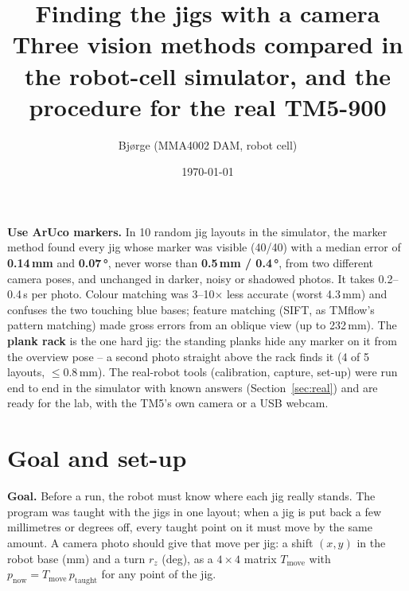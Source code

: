 \documentclass[11pt,a4paper]{article}
\title{\vspace{-14mm}\textbf{Finding the jigs with a camera}\\[1.5mm]
\large Three vision methods compared in the robot-cell simulator, and the procedure for the real TM5-900}
\author{Bjørge \quad (MMA4002 DAM, robot cell)}
\date{\today}
\begin{document}
\maketitle
\sloppy
\thispagestyle{fancy}
\vspace{-6mm}

\begin{tcolorbox}[colback=rowlt,colframe=hdrblue,title=\textbf{Outcome},fonttitle=\small,boxsep=1mm]
\small
\textbf{Use ArUco markers.} In 10 random jig layouts in the simulator, the marker method found every jig whose marker was
visible (40/40) with a median error of \textbf{0.14\,mm} and \textbf{0.07\,°}, never worse than \textbf{0.5\,mm / 0.4\,°},
from two different camera poses, and unchanged in darker, noisy or shadowed photos. It takes 0.2--0.4\,s per photo.
Colour matching was 3--10$\times$ less accurate (worst 4.3\,mm) and confuses the two touching blue bases; feature matching
(SIFT, as TMflow's pattern matching) made gross errors from an oblique view (up to 232\,mm).
The \textbf{plank rack} is the one hard jig: the standing planks hide any marker on it from the overview pose --
a second photo straight above the rack finds it (4 of 5 layouts, $\le$0.8\,mm).
The real-robot tools (calibration, capture, set-up) were run end to end in the simulator with known answers
(Section~\ref{sec:real}) and are ready for the lab, with the TM5's own camera or a USB webcam.
\end{tcolorbox}

\section{Goal and set-up}
\textbf{Goal.} Before a run, the robot must know where each jig really stands. The program was taught with the jigs in one
layout; when a jig is put back a few millimetres or degrees off, every taught point on it must move by the same amount.
A camera photo should give that move per jig: a shift $(x, y)$ in the robot base (mm) and a turn $r_z$ (deg), as a
$4\times4$ matrix $T_\text{move}$ with $p_\text{now} = T_\text{move}\,p_\text{taught}$ for any point of the jig.
\end{document}
